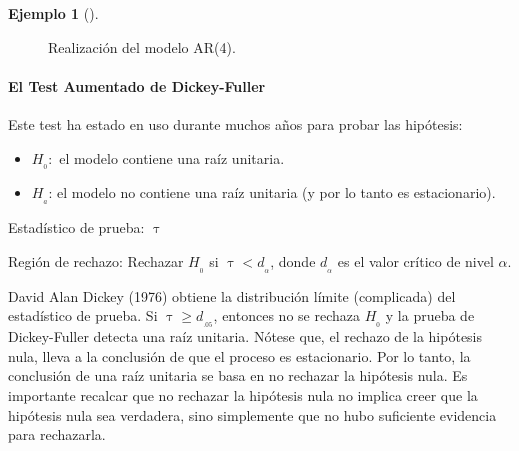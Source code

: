 \documentclass[
  us-letterpaper,
]{scrreprt}
\let\oldparagraph\paragraph
\renewcommand{\paragraph}[1]{\oldparagraph{#1}\mbox{}}
\theoremstyle{plain}
\theoremstyle{definition}
\theoremstyle{definition}
\newtheorem{example}{Ejemplo}[chapter]
\theoremstyle{plain}
\theoremstyle{remark}
\begin{document}
\begin{example}[]
\begin{tcolorbox}
\begin{figure}[H]

\caption{\label{fig-ejar4}Realización del modelo AR(4).}

\end{figure}%

\end{tcolorbox}

\end{example}

\paragraph{El Test Aumentado de
Dickey-Fuller}\label{el-test-aumentado-de-dickey-fuller}

Este test ha estado en uso durante muchos años para probar las
hipótesis:

\begin{itemize}
\item
  \(H_{_0}:\) el modelo contiene una raíz unitaria.
\item
  \(H_{_a}\): el modelo no contiene una raíz unitaria (y por lo tanto es
  estacionario).
\end{itemize}

Estadístico de prueba: \(\uptau\)

Región de rechazo: Rechazar \(H_{_0}\) si \(\uptau < d_{_\alpha}\),
donde \(d_{_\alpha}\) es el valor crítico de nivel \(\alpha\).

David Alan Dickey (1976) obtiene la distribución límite (complicada) del
estadístico de prueba. Si \(\uptau \geq d_{_{.05}}\), entonces no se
rechaza \(H_{_0}\) y la prueba de Dickey-Fuller detecta una raíz
unitaria. Nótese que, el rechazo de la hipótesis nula, lleva a la
conclusión de que el proceso es estacionario. Por lo tanto, la
conclusión de una raíz unitaria se basa en no rechazar la hipótesis
nula. Es importante recalcar que no rechazar la hipótesis nula no
implica creer que la hipótesis nula sea verdadera, sino simplemente que
no hubo suficiente evidencia para rechazarla.
\end{document}

